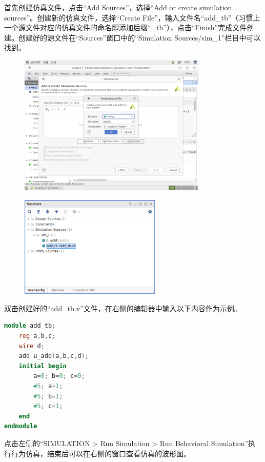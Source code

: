 \documentclass{ctexart}
\begin{document}
首先创建仿真文件，点击“Add Sources”，选择“Add or create simulation sources”。创建新的仿真文件，选择“Create File”，输入文件名“add\_tb”（习惯上一个源文件对应的仿真文件的命名即添加后缀“\_tb”），点击“Finish”完成文件创建。创建好的源文件在“Sources”窗口中的“Simulation Sources/sim\_1”栏目中可以找到。

\begin{figure}[H]
    \centering
    \includegraphics[width=0.8\textwidth]{lab0/21.png}
\end{figure}

\begin{figure}[H]
    \centering
    \includegraphics[width=0.6\textwidth]{lab0/22.png}
\end{figure}

双击创建好的“add\_tb.v”文件，在右侧的编辑器中输入以下内容作为示例。

\begin{lstlisting}[language=Verilog]
module add_tb;
    reg a,b,c;
    wire d;
    add u_add(a,b,c,d);
    initial begin
        a=0; b=0; c=0;
        #5; a=1;
        #5; b=1;
        #5; c=1;
    end
endmodule
\end{lstlisting}

点击左侧的“SIMULATION > Run Simulation > Run Behavioral Simulation”执行行为仿真，结束后可以在右侧的窗口查看仿真的波形图。
\end{document}
